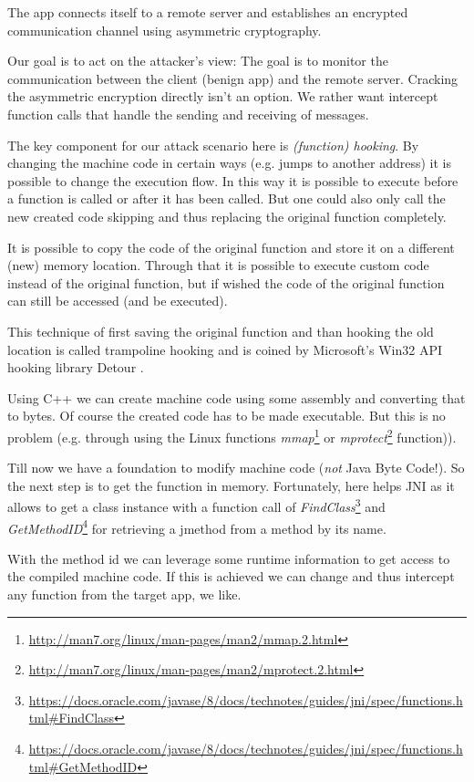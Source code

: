 The app connects itself to a remote server and establishes an encrypted communication channel using asymmetric cryptography.
  
Our goal is to act on the attacker's view: The goal is to monitor the communication between the client (benign app) and the remote server. 
Cracking the asymmetric encryption directly isn't an option. We rather want intercept function calls that handle the sending and receiving of messages.

The key component for our attack scenario here is \emph{(function) hooking}.
By changing the machine code in certain ways (e.g. jumps to another address) it is possible to change the execution flow. In this way it is possible to execute before a function is called or after it has been called. But one could also only call the new created code skipping and thus replacing the original function completely. 

It is possible to copy the code of the original function and store it on a different (new) memory location. 
Through that it is possible to execute custom code instead of the original function, but if wished the code of the original function can still be accessed (and be executed).  

This technique of first saving the original function and than hooking the old location is called trampoline hooking and is coined by Microsoft's Win32 API hooking library Detour \cite{detours-binary-interception-of-win32-functions}.

Using C++ we can create machine code using some assembly and converting that to bytes.
Of course the created code has to be made executable. But this is no problem (e.g. through using the Linux functions \emph{mmap}\footnote{\url{http://man7.org/linux/man-pages/man2/mmap.2.html}} or \emph{mprotect}\footnote{\url{http://man7.org/linux/man-pages/man2/mprotect.2.html}} function)).

Till now we have a foundation to modify machine code (\emph{not} Java Byte Code!). So the next step is to get the function in memory. Fortunately, here helps JNI as it allows to get a class instance with a function call of  \emph{FindClass}\footnote{\url{https://docs.oracle.com/javase/8/docs/technotes/guides/jni/spec/functions.html\#FindClass}} and \emph{GetMethodID}\footnote{\url{https://docs.oracle.com/javase/8/docs/technotes/guides/jni/spec/functions.html\#GetMethodID}} for retrieving a jmethod from a method by its name.

With the method id we can leverage some runtime information to get access to the compiled machine code. If this is achieved we can change and thus intercept any function from the target app, we like.


